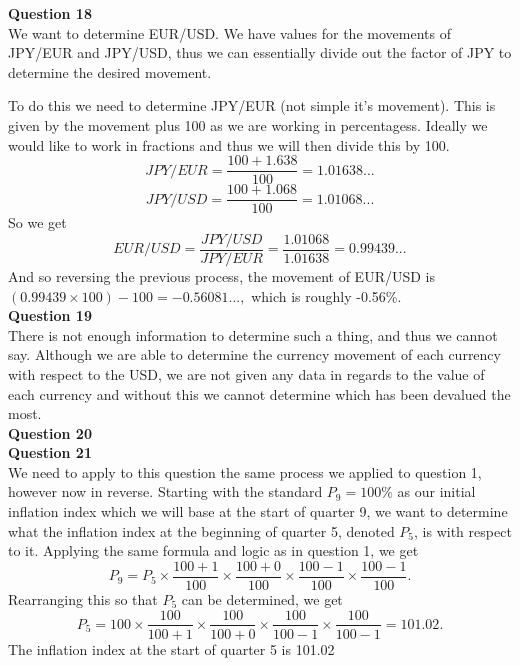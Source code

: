 \documentclass{article}
\begin{document}
\textbf{Question 18} \\
We want to determine EUR/USD. We have values for the movements of JPY/EUR and JPY/USD, thus we can essentially divide out the factor of JPY to determine the desired movement. 

To do this we need to determine JPY/EUR (not simple it's movement). This is given by the movement plus 100 as we are working in percentagess. Ideally we would like to work in fractions and thus we will then divide this by 100.
$$JPY/EUR = \frac{100+1.638}{100}=1.01638...$$
$$JPY/USD = \frac{100+1.068}{100}=1.01068...$$
So we get
$$EUR/USD = \frac{JPY/USD}{JPY/EUR} = \frac{1.01068}{1.01638} = 0.99439...$$
And so reversing the previous process, the movement of EUR/USD is $(0.99439 \times 100)-100=-0.56081...,$ which is roughly -0.56\%.\\

\textbf{Question 19} \\
There is not enough information to determine such a thing, and thus we cannot say. 
Although we are able to determine the currency movement of each currency with respect to the USD, we are not given any data in regards to the value of each currency and without this we cannot determine which has been devalued the most.\\

\textbf{Question 20} \\

\textbf{Question 21} \\
We need to apply to this question the same process we applied to question 1, however now in reverse. Starting with the standard $P_9 = 100\%$ as our initial inflation index which we will base at the start of quarter 9, we want to determine what the inflation index at the beginning of quarter 5, denoted $P_5$, is with respect to it. Applying the same formula and logic as in question 1, we get
$$P_9=P_{5} \times \frac{100+1}{100} \times \frac{100+0}{100} \times \frac{100-1}{100} \times \frac{100-1}{100}.$$
Rearranging this so that $P_5$ can be determined, we get
$$P_5 = 100 \times \frac{100}{100+1} \times \frac{100}{100+0} \times \frac{100}{100-1} \times \frac{100}{100-1}=101.02.$$
The inflation index at the start of quarter 5 is 101.02%
\end{document}
